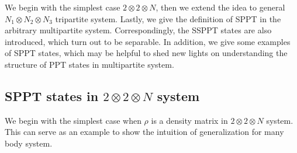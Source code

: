 We begin with the simplest case $2\otimes 2
\otimes N$, then we extend the idea to general $N_1\otimes N_2\otimes N_3$ tripartite system. Lastly, we give the
definition of SPPT in the arbitrary multipartite system. Correspondingly, the SSPPT states are also introduced, which turn
out to be separable. In addition, we give some examples of SPPT states, which may be helpful to  shed new lights on
understanding the structure of PPT states in multipartite system.


\subsection{SPPT states in \texorpdfstring{$2\otimes 2 \otimes N$}{TEXT} system}
We begin with the simplest case when $\rho$ is a density matrix in $2\otimes 2 \otimes N$ system.
This can serve as  an example to show the intuition of generalization for many body system.

